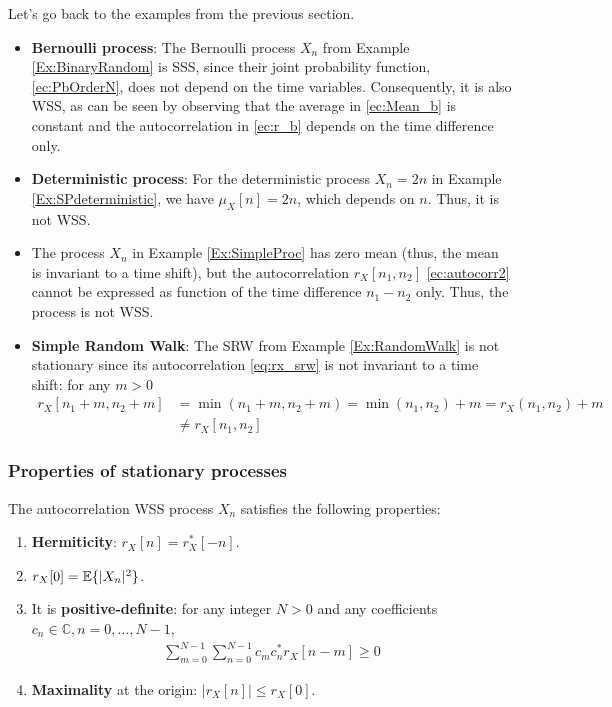 \begin{example}

Let's go back to the examples from the previous section.
\begin{itemize}
\item \textbf{Bernoulli process}: The Bernoulli process $X_n$ from Example \ref{Ex:BinaryRandom} is SSS, since their joint probability function, \eqref{ec:PbOrderN}, does not depend on the time variables. Consequently, it is also WSS, as can be seen by observing that the average in \eqref{ec:Mean_b} is constant and the autocorrelation in \eqref{ec:r_b} depends on the time difference only.

\item \textbf{Deterministic process}: For the deterministic process $X_n=2n$ in Example \ref{Ex:SPdeterministic}, we have $\mu_X[n]=2n$, which depends on $n$. Thus, it is not WSS. 

\item The process $X_n$ in Example \ref{Ex:SimpleProc} has zero mean (thus, the mean is invariant to a time shift), but the autocorrelation $r_X[n_1, n_2]$ \eqref{ec:autocorr2} cannot be expressed as function of the time difference $n_1 - n_2$ only. Thus, the process is not WSS.

\item \textbf{Simple Random Walk}: The SRW from Example \ref{Ex:RandomWalk} is not stationary since its autocorrelation \eqref{eq:rx_srw} is not invariant to a time shift: for any $m>0$
\begin{align}
r_X[n_1 + m, n_2 + m] &= \min(n_1 + m, n_2 + m) 
    = \min(n_1, n_2) + m = r_X(n_1, n_2) + m   \nonumber\\
    & \neq r_X[n_1, n_2]
\end{align}
\end{itemize}
\end{example}

\subsubsection{Properties of stationary processes}

\begin{theorem}

The autocorrelation WSS process $X_n$ satisfies the following properties:
\begin{enumerate}
\item \textbf{Hermiticity}: $r_X[n]=r_X^*[-n]$. 
\item $r_X[0]=\mathbb{E}\{|X_n|^2\}$.
\item It is \textbf{positive-definite}: for any integer $N>0$ and any coefficients $c_n \in 
\mathbb{C}, n=0,\ldots,N-1$, 
\begin{align}
\label{sp:pos_def}
\sum_{m=0}^{N-1}\sum_{n=0}^{N-1} c_m c_n^* r_X[n-m] \ge 0
\end{align}
\item \textbf{Maximality} at the origin: $|r_X[n]|\le r_X[0]$.
\end{enumerate}
\end{theorem}

